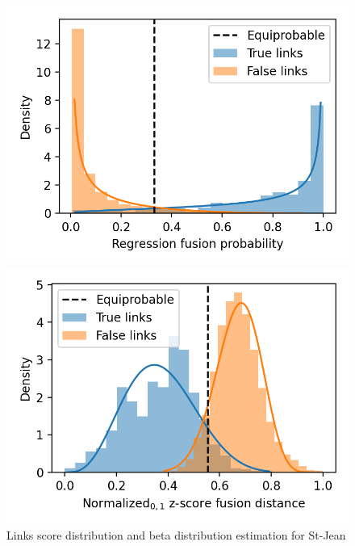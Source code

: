 \begin{figure}
  \caption{Links score distribution and beta distribution estimation for St-Jean}
  \label{fig:links_score_density}

  \label{fig:links_score_density_fusion_regression}
  \includegraphics[width=\linewidth]{img/links_score_density_fusion_regression.png}

  \vspace{0.5cm}

  \label{fig:links_score_density_fusion_z_score}
  \includegraphics[width=\linewidth]{img/links_score_density_fusion_z_score.png}
\end{figure}


